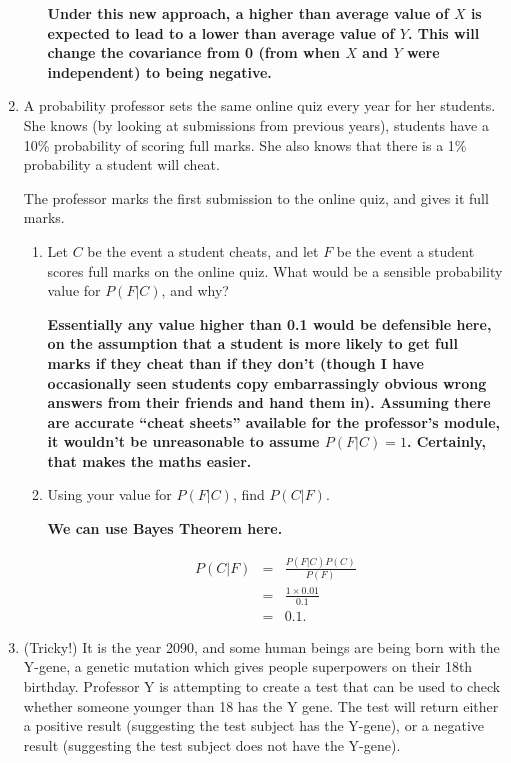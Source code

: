 \documentclass[11pt,a4paper]{article}
\begin{document}
\begin{enumerate}
\begin{enumerate}
\textbf{Under this new approach, a higher than average value of $X$ is expected to lead to a lower than average value of $Y$. This will change the covariance from 0 (from when $X$ and $Y$ were independent) to being negative.}

\end{enumerate}



\item A probability professor sets the same online quiz every year for her students. She knows (by looking at submissions from previous years), students have a 10\% probability of scoring full marks. She also knows that there is a 1\% probability a student will cheat.

The professor marks the first submission to the online quiz, and gives it full marks.

\begin{enumerate}
\item Let $C$ be the event a student cheats, and let $F$ be the event a student scores full marks on the online quiz. What would be a sensible probability value for $P(F|C)$, and why?

\textbf{Essentially any value higher than 0.1 would be defensible here, on the assumption that a student is more likely to get full marks if they cheat than if they don't (though I have occasionally seen students copy  embarrassingly obvious wrong answers from their friends and hand them in). Assuming there are accurate ``cheat sheets'' available for the professor's module, it wouldn't be unreasonable to assume $P(F|C)=1$. Certainly, that makes the maths easier.}

\item Using your value for $P(F|C)$, find $P(C|F)$.

\textbf{We can use Bayes Theorem here.}


\textbf{
\begin{eqnarray*}
P(C|F)&=&\frac{P(F|C)P(C)}{P(F)}\\
&=&\frac{1\times0.01}{0.1}\\
&=&0.1.
\end{eqnarray*}
}


\end{enumerate}

\item (Tricky!) It is the year 2090, and some human beings are being born with the Y-gene, a genetic mutation which gives people superpowers on their 18th birthday. Professor Y is attempting to create a test that can be used to check whether someone younger than 18 has the Y gene. The test will return either a positive result (suggesting the test subject has the Y-gene), or a negative result (suggesting the test subject does not have the Y-gene).  


\end{enumerate}
\end{document}
